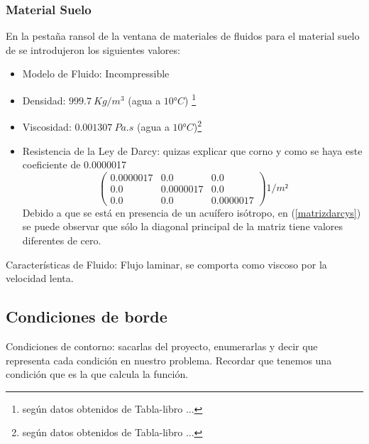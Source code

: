 \documentclass[10pt,a4paper,final]{article}
\begin{document}
\subsubsection{Material Suelo}
En la pestaña ransol de la ventana de materiales de fluidos para el material suelo de  se introdujeron los siguientes valores:
\begin{itemize}
\item Modelo de Fluido: Incompressible
\item Densidad: $999.7~Kg/m^3$ (agua a $10° C$) \footnote{ según datos obtenidos de Tabla-libro ...}
\item Viscosidad: $0.001307~Pa.s$ (agua a $10° C$)\footnote{ según datos obtenidos de Tabla-libro ...}
\item Resistencia de la Ley de Darcy:
quizas explicar que corno y como se haya este coeficiente de 0.0000017
\begin{equation}
\begin{pmatrix}{}
0.0000017 & 0.0 & 0.0 \\ 
0.0 & 0.0000017 & 0.0 \\ 
0.0 & 0.0 & 0.0000017
\end{pmatrix} 1/m²
\label{matrizdarcys}
\end{equation}
Debido a que se está en presencia de un acuífero isótropo, en (\ref{matrizdarcys}) se puede observar que sólo la diagonal principal de la matriz tiene valores diferentes de cero.
\end{itemize}
Características de Fluido: Flujo laminar, se comporta como viscoso por
la velocidad lenta.
%
%
\subsection{Condiciones de borde}
Condiciones de contorno: sacarlas del proyecto, enumerarlas y decir
que representa cada condición en nuestro problema. Recordar que
tenemos una condición que es la que calcula la función.
\end{document}
